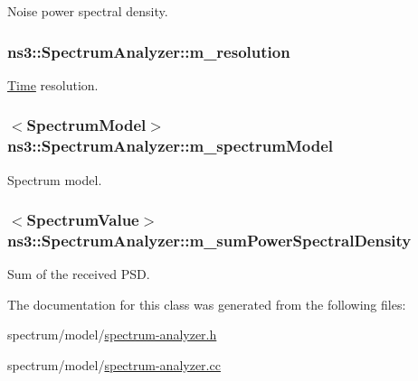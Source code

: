 Noise power spectral density. 

\subsubsection[{\texorpdfstring{m\+\_\+resolution}{m_resolution}}]{ ns3\+::\+Spectrum\+Analyzer\+::m\+\_\+resolution\hspace{0.3cm}{\ttfamily [private]}}\hypertarget{classns3_1_1SpectrumAnalyzer_a4f5652202cd95f66b350caea4e76ff61}{}\label{classns3_1_1SpectrumAnalyzer_a4f5652202cd95f66b350caea4e76ff61}


\hyperlink{classns3_1_1Time}{Time} resolution. 

\subsubsection[{\texorpdfstring{m\+\_\+spectrum\+Model}{m_spectrumModel}}]{$<${\bf Spectrum\+Model}$>$ ns3\+::\+Spectrum\+Analyzer\+::m\+\_\+spectrum\+Model\hspace{0.3cm}{\ttfamily [private]}}\hypertarget{classns3_1_1SpectrumAnalyzer_a78314e27bf7ac8c346b36882aa688cb2}{}\label{classns3_1_1SpectrumAnalyzer_a78314e27bf7ac8c346b36882aa688cb2}


Spectrum model. 

\subsubsection[{\texorpdfstring{m\+\_\+sum\+Power\+Spectral\+Density}{m_sumPowerSpectralDensity}}]{$<${\bf Spectrum\+Value}$>$ ns3\+::\+Spectrum\+Analyzer\+::m\+\_\+sum\+Power\+Spectral\+Density\hspace{0.3cm}{\ttfamily [private]}}\hypertarget{classns3_1_1SpectrumAnalyzer_a8afa70cbc19bcd5a1fe2567eecc826d7}{}\label{classns3_1_1SpectrumAnalyzer_a8afa70cbc19bcd5a1fe2567eecc826d7}


Sum of the received P\+SD. 



The documentation for this class was generated from the following files\+:\begin{DoxyCompactItemize}
\item 
spectrum/model/\hyperlink{spectrum-analyzer_8h}{spectrum-\/analyzer.\+h}\item 
spectrum/model/\hyperlink{spectrum-analyzer_8cc}{spectrum-\/analyzer.\+cc}\end{DoxyCompactItemize}
